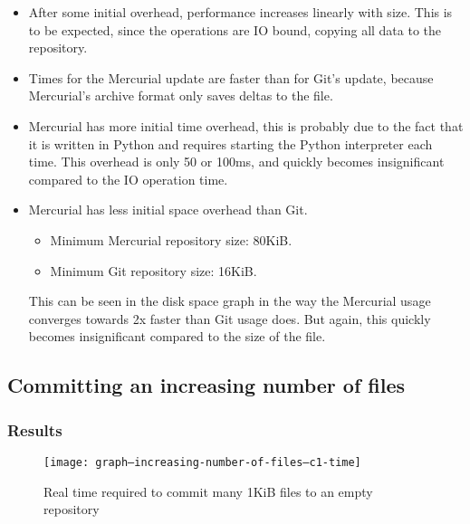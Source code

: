 \documentclass[a4paper]{article}
\begin{document}
\begin{itemize}

    \item After some initial overhead, performance increases linearly with size.
        This is to be expected, since the operations are IO bound, copying all
        data to the repository.

    \item Times for the Mercurial update are faster than for Git's update,
        because Mercurial's archive format only saves deltas to the file.

    \item Mercurial has more initial time overhead, this is probably due to the
        fact that it is written in Python and requires starting the Python
        interpreter each time. This overhead is only 50 or 100ms, and quickly
        becomes insignificant compared to the IO operation time.

    \item Mercurial has less initial space overhead than Git.

        \begin{itemize}
            \setlength{\itemsep}{0pt}
            \setlength{\parskip}{0pt}
            \setlength{\parsep}{0pt}
            \item Minimum Mercurial repository size: 80KiB.
            \item Minimum Git repository size: 16KiB.
        \end{itemize}

        This can be seen in the disk space graph in the way the Mercurial usage
        converges towards 2x faster than Git usage does. But again, this quickly
        becomes insignificant compared to the size of the file.

\end{itemize}

\fi

\subsection{Committing an increasing number of files}

\subsubsection{Results}

\begin{figure}[p]
  \caption{Real time required to commit many 1KiB files to an empty repository}
  \label{fig:graph--increasing-number-of-files--c1-time}
  \centering
    \texttt{[image: graph--increasing-number-of-files--c1-time]}
\end{figure}
\end{document}
